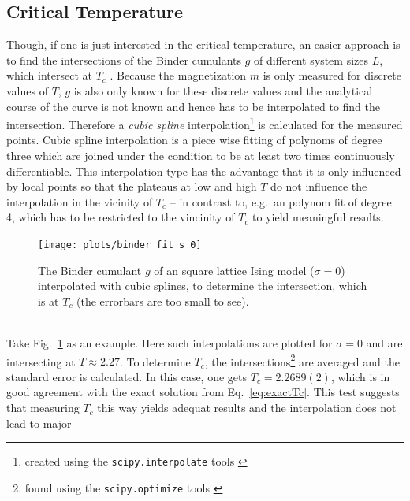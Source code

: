 \subsection{Critical Temperature}
\label{ssec:binderIntersections}
    Though, if one is just interested in the critical temperature, an
    easier approach is to find the intersections of the Binder cumulants
    \(g\) of different system sizes \(L\), which intersect at \(T_c\) \cite{Binder1981}.
    Because the magnetization \(m\) is only measured for discrete values
    of \(T\), \(g\) is also only known for these discrete values and the
    analytical course of the curve is not known and hence has
    to be interpolated to find the intersection. Therefore a \emph{cubic spline}
    interpolation\footnote{created using the \texttt{scipy.interpolate} tools \cite{scipy2001}}
    is calculated for the measured points.
    Cubic spline interpolation is a piece wise fitting of polynoms of
    degree three which are joined under the condition to be at least two
    times continuously differentiable. This interpolation type has the
    advantage that it is only influenced by local points so that the
    plateaus at low and high \(T\) do not influence the interpolation in
    the vicinity of \(T_c\) -- in contrast to, e.g.\ an polynom fit of
    degree 4, which has to be restricted to the vincinity of \(T_c\) to
    yield meaningful results.
    \begin{figure}[htbp]
        \centering
        \texttt{[image: plots/binder\_fit\_s\_0]}
        \caption[Example of a Binder Cumulant to Determine the Critical Temperature]
        {
            The Binder cumulant \(g\) of an square lattice Ising model
            (\(\sigma=0\)) interpolated with cubic splines, to determine
            the intersection, which is at \(T_c\)
            (the errorbars are too small to see).
        }
        \label{fig:gettingCrit:binder_fit_s_0}
    \end{figure}\\
    Take Fig.\ \ref{fig:gettingCrit:binder_fit_s_0} as an example.
    Here such interpolations are plotted for \(\sigma=0\) and are
    intersecting at \(T \approx 2.27\).
    To determine \(T_c\), the intersections\footnote{found using the \texttt{scipy.optimize} tools \cite{scipy2001}}
    are averaged and the standard error is calculated. In this case, one
    gets \(T_c = 2.2689(2)\), which is in good agreement with the
    exact solution from Eq.\ \eqref{eq:exactTc}.
    This test suggests that measuring \(T_c\) this way yields
    adequat results and the interpolation does not lead to major
